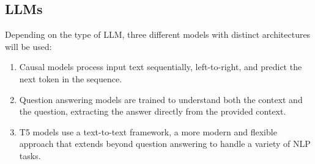 \documentclass{wseas}
\begin{document}
\subsection{LLMs}
Depending on the type of LLM, three different models with distinct architectures will be used:

\begin{enumerate} 
  \item Causal models process input text sequentially, left-to-right, and predict the next token in the sequence. 
  \item Question answering models are trained to understand both the context and the question, extracting the answer directly from the provided context. 
  \item T5 models use a text-to-text framework, a more modern and flexible approach that extends beyond question answering to handle a variety of NLP tasks. 
\end{enumerate}
\end{document}

